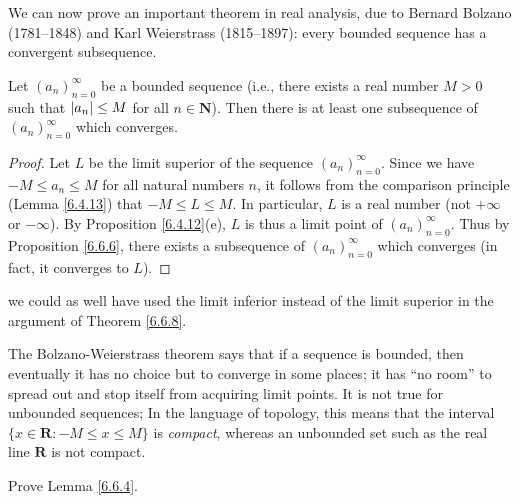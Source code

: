 \begin{note}
    We can now prove an important theorem in real analysis, due to Bernard Bolzano (1781--1848) and Karl Weierstrass (1815--1897):
    every bounded sequence has a convergent subsequence.
\end{note}

\begin{theorem}\label{6.6.8}
    Let \((a_n)_{n = 0}^\infty\) be a bounded sequence
    (i.e., there exists a real number \(M > 0\) such that \(\abs*{a_n} \leq M\) for all \(n \in \mathbf{N}\)).
    Then there is at least one subsequence of \((a_n)_{n = 0}^\infty\) which converges.
\end{theorem}

\begin{proof}
    Let \(L\) be the limit superior of the sequence \((a_n)_{n = 0}^\infty\).
    Since we have \(-M \leq a_n \leq M\) for all natural numbers \(n\), it follows from the comparison principle (Lemma \ref{6.4.13}) that \(-M \leq L \leq M\).
    In particular, \(L\) is a real number (not \(+\infty\) or \(-\infty\)).
    By Proposition \ref{6.4.12}(e), \(L\) is thus a limit point of \((a_n)_{n = 0}^\infty\).
    Thus by Proposition \ref{6.6.6}, there exists a subsequence of \((a_n)_{n = 0}^\infty\) which converges
    (in fact, it converges to \(L\)).
\end{proof}

\begin{note}
    we could as well have used the limit inferior instead of the limit superior in the argument of Theorem \ref{6.6.8}.
\end{note}

\begin{remark}\label{6.6.9}
    The Bolzano-Weierstrass theorem says that if a sequence is bounded, then eventually it has no choice but to converge in some places;
    it has ``no room'' to spread out and stop itself from acquiring limit points.
    It is not true for unbounded sequences;
    In the language of topology, this means that the interval \(\{x \in \mathbf{R} : -M \leq x \leq M\}\) is \emph{compact}, whereas an unbounded set such as the real line \(\mathbf{R}\) is not compact.
\end{remark}

\exercisesection

\begin{exercise}\label{ex 6.6.1}
    Prove Lemma \ref{6.6.4}.
\end{exercise}

